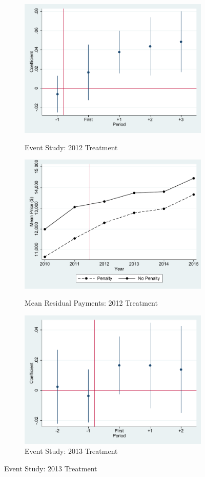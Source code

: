\documentclass[12pt]{article}
\begin{document}
\newpage
\begin{figure}[!htb]
\caption{Evidence of Parallel or Differential Trends}
\label{fig:event_resid}
\begin{subfigure}{.5\textwidth}
 \caption{Event Study: 2012 Treatment}
  \centering
  \includegraphics[width=.8\linewidth]{ev_lnprice_hcci_2012.pdf}
  \label{fig:sfig1}
\end{subfigure}%
\begin{subfigure}{.5\textwidth}
  \centering
  \caption{Mean Residual Payments: 2012 Treatment}
  \includegraphics[width=.8\linewidth]{price_resid_2012.pdf}
  \label{fig:sfig2}
\end{subfigure}
\begin{subfigure}{.5\textwidth}
  \centering
  \caption{Event Study: 2013 Treatment}
  \includegraphics[width=.8\linewidth]{ev_lnprice_hcci_2013.pdf}

\end{subfigure}
\end{figure}
\end{document}
